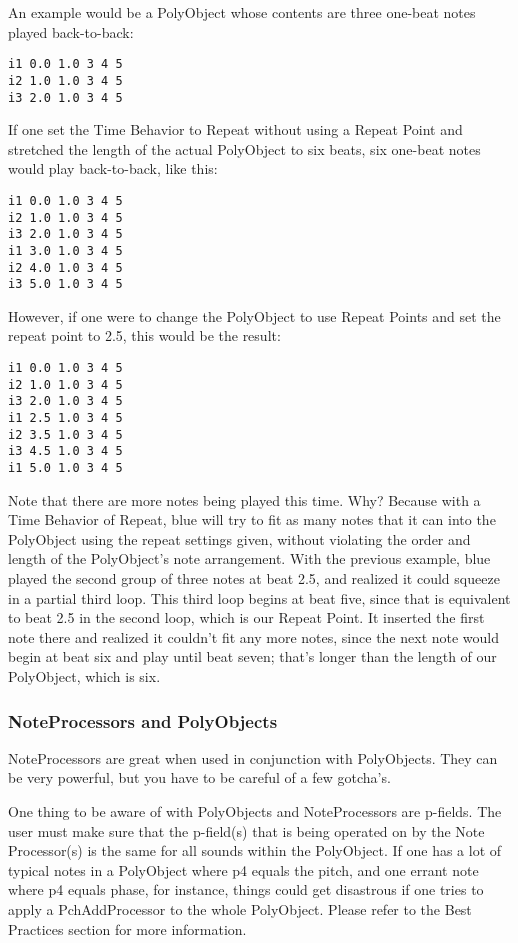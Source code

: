 An example would be a PolyObject whose contents are three one-beat notes
played back-to-back:

\begin{verbatim}
i1 0.0 1.0 3 4 5
i2 1.0 1.0 3 4 5
i3 2.0 1.0 3 4 5
\end{verbatim}

If one set the Time Behavior to Repeat without using a Repeat Point and
stretched the length of the actual PolyObject to six beats, six one-beat
notes would play back-to-back, like this:

\begin{verbatim}
i1 0.0 1.0 3 4 5
i2 1.0 1.0 3 4 5
i3 2.0 1.0 3 4 5
i1 3.0 1.0 3 4 5
i2 4.0 1.0 3 4 5
i3 5.0 1.0 3 4 5
\end{verbatim}

However, if one were to change the PolyObject to use Repeat Points and
set the repeat point to 2.5, this would be the result:

\begin{verbatim}
i1 0.0 1.0 3 4 5
i2 1.0 1.0 3 4 5
i3 2.0 1.0 3 4 5
i1 2.5 1.0 3 4 5
i2 3.5 1.0 3 4 5
i3 4.5 1.0 3 4 5
i1 5.0 1.0 3 4 5
\end{verbatim}

Note that there are more notes being played this time. Why? Because with
a Time Behavior of Repeat, blue will try to fit as many notes that it
can into the PolyObject using the repeat settings given, without
violating the order and length of the PolyObject's note arrangement.
With the previous example, blue played the second group of three notes
at beat 2.5, and realized it could squeeze in a partial third loop. This
third loop begins at beat five, since that is equivalent to beat 2.5 in
the second loop, which is our Repeat Point. It inserted the first note
there and realized it couldn't fit any more notes, since the next note
would begin at beat six and play until beat seven; that's longer than
the length of our PolyObject, which is six.

\subsubsection{NoteProcessors and PolyObjects}

NoteProcessors are great when used in conjunction with PolyObjects. They
can be very powerful, but you have to be careful of a few gotcha's.

One thing to be aware of with PolyObjects and NoteProcessors are
p-fields. The user must make sure that the p-field(s) that is being
operated on by the Note Processor(s) is the same for all sounds within
the PolyObject. If one has a lot of typical notes in a PolyObject where
p4 equals the pitch, and one errant note where p4 equals phase, for
instance, things could get disastrous if one tries to apply a
PchAddProcessor to the whole PolyObject. Please refer to the Best
Practices section for more information.

